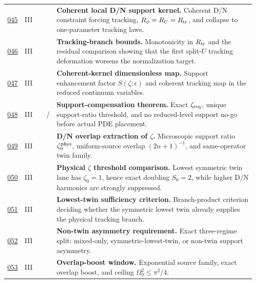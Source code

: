 {\begin{longtable}{@{}L{0.055\textwidth}L{0.075\textwidth}L{0.145\textwidth}L{0.235\textwidth}L{0.43\textwidth}@{}}
\addlinespace
\hyperref[stage:045]{045} & III &  & \StatusExactClosure{} & \textbf{Coherent local D/N support kernel.} Coherent D/N constraint forcing tracking, \(R_\phi=R_U=R_{\rm tr}\), and collapse to one-parameter tracking laws. \\
\addlinespace
\hyperref[stage:046]{046} & III &  & \StatusExactClosure{} & \textbf{Tracking-branch bounds.} Monotonicity in \(R_{\rm tr}\) and the residual comparison showing that the first split-\(U\) tracking deformation worsens the normalization target. \\
\addlinespace
\hyperref[stage:047]{047} & III &  & \StatusExactClosure{} & \textbf{Coherent-kernel dimensionless map.} Support enhancement factor \(S(\zeta;\epsilon)\) and coherent tracking map in the reduced continuum variables. \\
\addlinespace
\hyperref[stage:048]{048} & III &  & \StatusExactClosure{} / \StatusOpen{} & \textbf{Support-compensation theorem.} Exact \(\zeta_{\rm req}\), unique support-ratio threshold, and no reduced-level support no-go before actual PDE placement. \\
\addlinespace
\hyperref[stage:049]{049} & III &  & \StatusExactClosure{} & \textbf{D/N overlap extraction of \(\zeta\).} Microscopic support ratio \(\zeta_n^{\rm phys}\), uniform-source overlap \((2n+1)^{-1}\), and same-operator twin family. \\
\addlinespace
\hyperref[stage:050]{050} & III &  & \StatusExactClosure{} & \textbf{Physical \(\zeta\) threshold comparison.} Lowest symmetric twin lane has \(\zeta_0=1\), hence exact doubling \(S_0=2\), while higher D/N harmonics are strongly suppressed. \\
\addlinespace
\hyperref[stage:051]{051} & III &  & \StatusExactClosure{} & \textbf{Lowest-twin sufficiency criterion.} Branch-product criterion deciding whether the symmetric lowest twin already supplies the physical tracking branch. \\
\addlinespace
\hyperref[stage:052]{052} & III &  & \StatusExactClosure{} & \textbf{Non-twin asymmetry requirement.} Exact three-regime split: mixed-only, symmetric-lowest-twin, or non-twin support asymmetry. \\
\addlinespace
\hyperref[stage:053]{053} & III &  & \StatusExactClosure{} & \textbf{Overlap-boost window.} Exponential source family, exact overlap boost, and ceiling \(\Omega_0^2\leq \pi^2/4\). \\

\end{longtable}}
